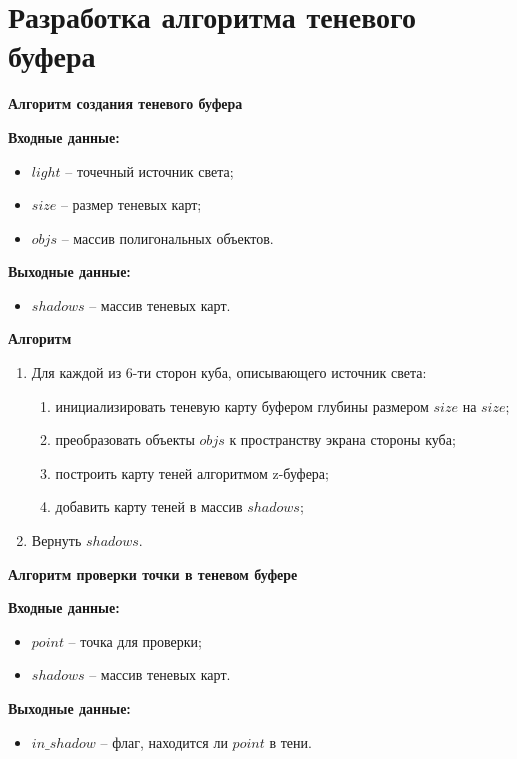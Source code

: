 \section{Разработка алгоритма теневого буфера}

\textbf{Алгоритм создания теневого буфера}

\textbf{Входные данные:}
\begin{itemize}
	\item $light$ -- точечный источник света;
	\item $size$ -- размер теневых карт;
	\item $objs$ -- массив полигональных объектов.
\end{itemize}

\textbf{Выходные данные:}
\begin{itemize}
	\item $shadows$ -- массив теневых карт.
\end{itemize}

\textbf{Алгоритм}
\begin{enumerate}
	\item Для каждой из 6-ти сторон куба, описывающего источник света:
	\begin{enumerate}
		\item инициализировать теневую карту буфером глубины размером $size$ на $size$;
		\item преобразовать объекты $objs$ к пространству экрана стороны куба;
		\item построить карту теней алгоритмом z-буфера;
		\item добавить карту теней в массив $shadows$;
	\end{enumerate}
	\item Вернуть $shadows$.
\end{enumerate}


\textbf{Алгоритм проверки точки в теневом буфере}

\textbf{Входные данные:}
\begin{itemize}
	\item $point$ -- точка для проверки;
	\item $shadows$ -- массив теневых карт.
\end{itemize}

\textbf{Выходные данные:}
\begin{itemize}
	\item $in\_shadow$ -- флаг, находится ли $point$ в тени.
\end{itemize}

